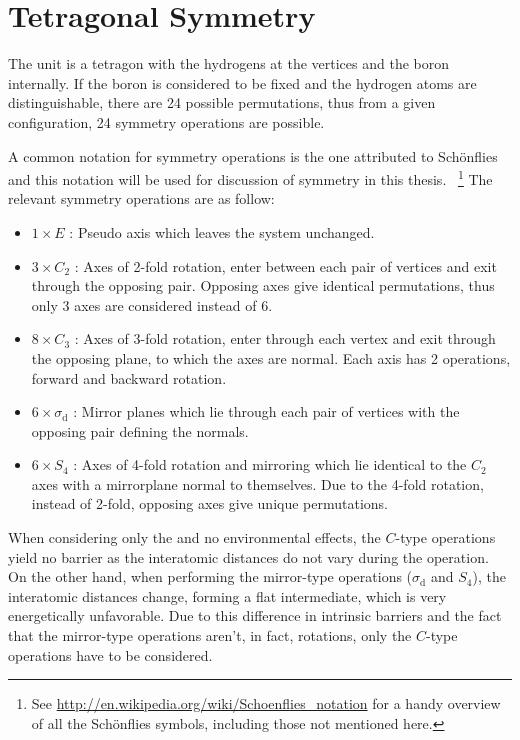 \section{Tetragonal Symmetry}
\label{sec:symmetry}

The  unit is a tetragon with the hydrogens at the vertices and the boron internally.
If the boron is considered to be fixed and the hydrogen atoms are distinguishable, there are 24 possible permutations, thus from a given configuration, 24 symmetry operations are possible.

A common notation for symmetry operations is the one attributed to Sch\"onflies~\cite{schonflies-notation-1889} and this notation will be used for discussion of symmetry in this thesis.
~\footnote{See \url{http://en.wikipedia.org/wiki/Schoenflies_notation} for a handy overview of all the Sch\"onflies symbols, including those not mentioned here.}
The relevant symmetry operations are as follow:
\begin{itemize}
\item $1 \times E$ : Pseudo axis which leaves the system unchanged.
\item $3 \times C_2$ : Axes of 2-fold rotation, enter between each pair of vertices and exit through the opposing pair.
Opposing axes give identical permutations, thus only 3 axes are considered instead of 6.
\item $8 \times C_3$ : Axes of 3-fold rotation, enter through each vertex and exit through the opposing plane, to which the axes are normal. Each axis has 2 operations, forward and backward rotation.
\item $6 \times \sigma_\text{d}$ : Mirror planes which lie through each pair of vertices with the opposing pair defining the normals.
\item $6 \times S_4$ : Axes of 4-fold rotation and mirroring which lie identical to the $C_2$ axes with a mirrorplane normal to themselves. Due to the 4-fold rotation, instead of 2-fold, opposing axes give unique permutations.
\end{itemize}

When considering only the  and no environmental effects, the $C$-type operations yield no barrier as the interatomic distances do not vary during the operation.
On the other hand, when performing the mirror-type operations ($\sigma_\text{d}$ and $S_4$), the interatomic distances change, forming a flat  intermediate, which is very energetically unfavorable.
Due to this difference in intrinsic barriers and the fact that the mirror-type operations aren't, in fact, rotations, only the $C$-type operations have to be considered.
